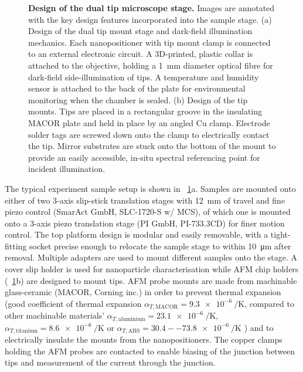 \documentclass{article}
\begin{document}
\begin{figure}[bt]
\begin{subfigure}[t]{0.43\textwidth}
\end{subfigure}
\caption[Design of the dual tip microscope stage]{\textbf{Design of the dual tip microscope stage.} Images are annotated with the key design features incorporated into the sample stage.
(a) Design of the dual tip mount stage and dark-field illumination mechanics. Each nanopositioner with tip mount clamp is connected to an external electronic circuit. A 3D-printed, plastic collar is attached to the objective, holding a \SI{1}{mm} diameter optical fibre for dark-field side-illumination of tips. A temperature and humidity sensor is attached to the back of the plate for environmental monitoring when the chamber is sealed.
(b) Design of the tip mounts. Tips are placed in a rectangular groove in the insulating MACOR plate and held in place by an angled Cu clamp. Electrode solder tags are screwed down onto the clamp to electrically contact the tip. Mirror substrates are stuck onto the bottom of the mount to provide an easily accessible, in-situ spectral referencing point for incident illumination.}
\label{fig:tip_mount_design}
\vspace{-15pt}
\end{figure}

The typical experiment sample setup is shown in \figurename~\ref{fig:tip_mount_design}a. Samples are mounted onto either of two 3-axis slip-stick translation stages with \SI{12}{mm} of travel and fine piezo control (SmarAct GmbH, SLC-1720-S w/ MCS), of which one is mounted onto a 3-axis piezo translation stage (PI GmbH, PI-733.3CD) for finer motion control. The top platform design is modular and easily removable, with a tight-fitting socket precise enough to relocate the sample stage to within \SI{10}{\micro\metre} after removal. Multiple adapters are used to mount different samples onto the stage. A cover slip holder is used for nanoparticle characterisation while AFM chip holders (\figurename~\ref{fig:tip_mount_design}b) are designed to mount tips.
AFM probe mounts are made from machinable glass-ceramic (MACOR, Corning inc.) in order to prevent thermal expansion (good coefficient of thermal expansion $\alpha_{T, \mathrm{MACOR}}=\SI{9.3e-6}{\per\kelvin}$, compared to other machinable materials' $\alpha_{T,\mathrm{aluminium}}=\SI{23.1e-6}{\per\kelvin}$, $\alpha_{T, \mathrm{titanium}}=\SI{8.6e-6}{\per\kelvin}$ or $\alpha_{T, \mathrm{ABS}}=30.4--\SI{73.8e-6}{\per\kelvin}$ \cite{haynes2013crc}) and to electrically insulate the mounts from the nanopositioners. The copper clamps holding the AFM probes are contacted to enable biasing of the junction between tips and measurement of the current through the junction.
\end{document}
